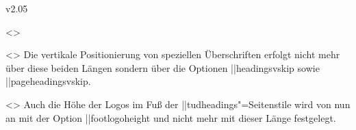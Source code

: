 \begin{Changes}{v2.05}
\begin{Obsolete}
  {}
  <>
\begin{Obsolete}
  {}
  <>
\printdeclarationlist
%
Die vertikale Positionierung von speziellen Überschriften erfolgt nicht mehr 
über diese beiden Längen sondern über die Optionen \Option||{headingsvskip} 
sowie \Option||{pageheadingsvskip}.
\end{Obsolete}
\end{Obsolete}


\begin{Obsolete}
  {}
  <>
\printdeclarationlist
%
Auch die Höhe der Logos im Fuß der \PageStyle||{tudheadings}"=Seitenstile wird 
von nun an mit der Option \Option||{footlogoheight} und nicht mehr mit dieser 
Länge festgelegt.
\end{Obsolete}
\end{Changes}



